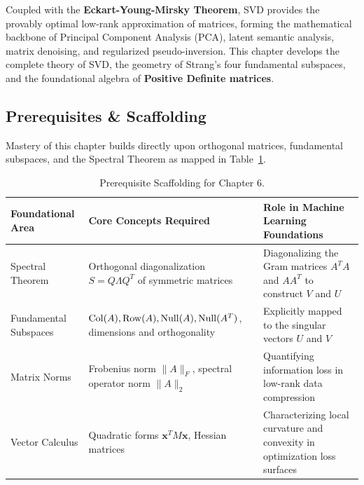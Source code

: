 Coupled with the \textbf{Eckart-Young-Mirsky Theorem}, SVD provides the provably optimal low-rank approximation of matrices, forming the mathematical backbone of Principal Component Analysis (PCA), latent semantic analysis, matrix denoising, and regularized pseudo-inversion. This chapter develops the complete theory of SVD, the geometry of Strang's four fundamental subspaces, and the foundational algebra of \textbf{Positive Definite matrices}.

\subsection{Prerequisites \& Scaffolding}
Mastery of this chapter builds directly upon orthogonal matrices, fundamental subspaces, and the Spectral Theorem as mapped in Table~\ref{tab:w06_prereqs}.

\begin{table}[htbp]
\centering
\small
\begin{tabularx}{\textwidth}{lXX}
\toprule
\textbf{Foundational Area} & \textbf{Core Concepts Required} & \textbf{Role in Machine Learning Foundations} \\
\midrule
Spectral Theorem & Orthogonal diagonalization $S = Q \Lambda Q^T$ of symmetric matrices & Diagonalizing the Gram matrices $A^T A$ and $A A^T$ to construct $V$ and $U$ \\
\addlinespace
Fundamental Subspaces & $\operatorname{Col}(A), \operatorname{Row}(A), \operatorname{Null}(A), \operatorname{Null}(A^T)$, dimensions and orthogonality & Explicitly mapped to the singular vectors $U$ and $V$ \\
\addlinespace
Matrix Norms & Frobenius norm $\|A\|_F$, spectral operator norm $\|A\|_2$ & Quantifying information loss in low-rank data compression \\
\addlinespace
Vector Calculus & Quadratic forms $\mathbf{x}^T M \mathbf{x}$, Hessian matrices & Characterizing local curvature and convexity in optimization loss surfaces \\
\bottomrule
\end{tabularx}
\caption{Prerequisite Scaffolding for Chapter 6.}
\label{tab:w06_prereqs}
\end{table}

